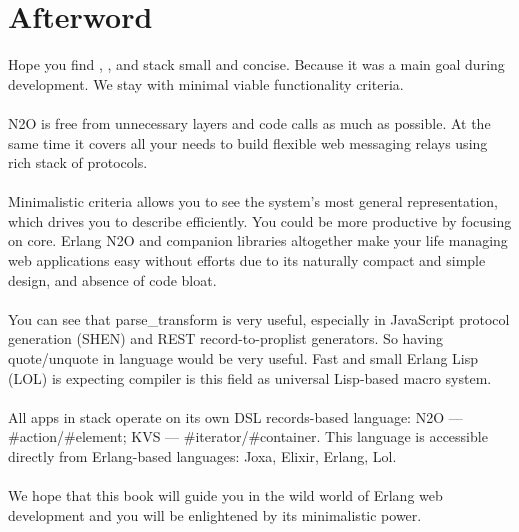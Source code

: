 
\begingroup
\section{Afterword}

Hope you find ,
, and
 stack small and concise.
Because it was a main goal during development.
We stay with minimal viable functionality criteria.

\paragraph{}
N2O is free from unnecessary layers and code calls as much as possible.
At the same time it covers all your needs to build
flexible web messaging relays using rich stack of protocols.

\paragraph{}
Minimalistic criteria allows you to see the system's
most general representation, which drives you to describe efficiently.
You could be more productive by focusing on core.
Erlang N2O and companion libraries altogether make
your life managing web applications easy without
efforts due to its naturally compact and simple design, and absence of code bloat.

\paragraph{}
You can see that parse\_transform is very useful, especially in JavaScript
protocol generation (SHEN) and REST record-to-proplist generators. So having
quote/unquote in language would be very useful. Fast and small
Erlang Lisp (LOL) is expecting compiler is this field as universal
Lisp-based macro system.

\paragraph{}
All apps in stack operate on its own DSL records-based language:
N2O --- \#action/\#element; KVS --- \#iterator/\#container.
This language is accessible directly from Erlang-based languages: Joxa, Elixir, Erlang, Lol.

\paragraph{}
We hope that this book will guide you in the wild world of Erlang web development
and you will be enlightened by its minimalistic power.
\endgroup

